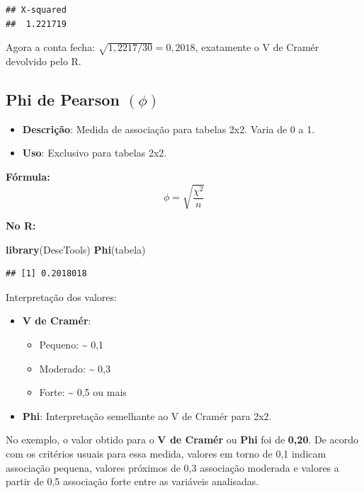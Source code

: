 \documentclass[
]{book}
\newenvironment{Shaded}{\begin{snugshade}}{\end{snugshade}}
\newcommand{\FunctionTok}[1]{\textcolor[rgb]{0.13,0.29,0.53}{\textbf{#1}}}
\newcommand{\NormalTok}[1]{#1}
\providecommand{\tightlist}{%
  \setlength{\itemsep}{0pt}\setlength{\parskip}{0pt}}
\begin{document}
\begin{verbatim}
## X-squared 
##  1.221719
\end{verbatim}

Agora a conta fecha: \(\sqrt{1{,}2217/30} = 0{,}2018\), exatamente o V de Cramér devolvido pelo R.

\subsection{\texorpdfstring{Phi de Pearson \((\phi)\)}{Phi de Pearson (\textbackslash phi)}}\label{phi-de-pearson-phi}

\begin{itemize}
\tightlist
\item
  \textbf{Descrição}: Medida de associação para tabelas 2x2. Varia de 0 a 1.
\item
  \textbf{Uso}: Exclusivo para tabelas 2x2.
\end{itemize}

\textbf{Fórmula:}
\[
\phi = \sqrt{\frac{\chi^2}{n}}
\]

\textbf{No R:}

\begin{Shaded}
\begin{Highlighting}[]
\FunctionTok{library}\NormalTok{(DescTools)}
\FunctionTok{Phi}\NormalTok{(tabela)}
\end{Highlighting}
\end{Shaded}

\begin{verbatim}
## [1] 0.2018018
\end{verbatim}

Interpretação dos valores:

\begin{itemize}
\tightlist
\item
  \textbf{V de Cramér}:

  \begin{itemize}
  \tightlist
  \item
    Pequeno: \textasciitilde{} 0,1
  \item
    Moderado: \textasciitilde{} 0,3
  \item
    Forte: \textasciitilde{} 0,5 ou mais
  \end{itemize}
\item
  \textbf{Phi}: Interpretação semelhante ao V de Cramér para 2x2.
\end{itemize}

No exemplo, o valor obtido para o \textbf{V de Cramér} ou \textbf{Phi} foi de \textbf{0,20}. De acordo com os critérios usuais para essa medida, valores em torno de 0,1 indicam associação pequena, valores próximos de 0,3 associação moderada e valores a partir de 0,5 associação forte entre as variáveis analisadas.
\end{document}

